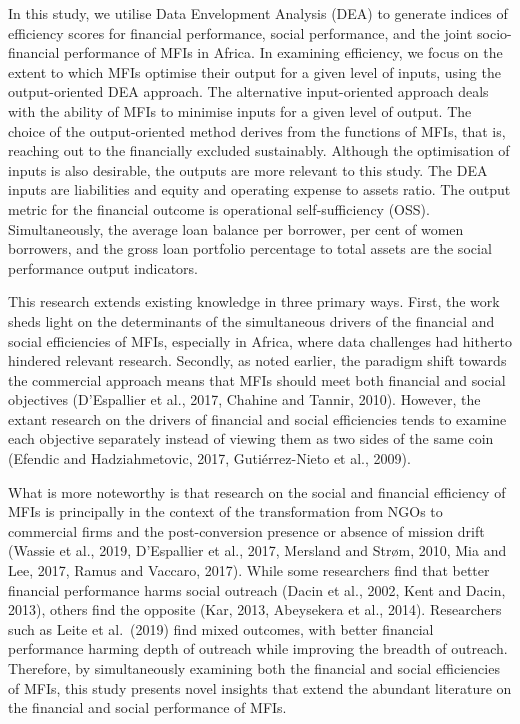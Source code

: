 \documentclass[
]{article}
\begin{document}
In this study, we utilise Data Envelopment Analysis (DEA) to generate
indices of efficiency scores for financial performance, social
performance, and the joint socio-financial performance of MFIs in
Africa. In examining efficiency, we focus on the extent to which MFIs
optimise their output for a given level of inputs, using the
output-oriented DEA approach. The alternative input-oriented approach
deals with the ability of MFIs to minimise inputs for a given level of
output. The choice of the output-oriented method derives from the
functions of MFIs, that is, reaching out to the financially excluded
sustainably. Although the optimisation of inputs is also desirable, the
outputs are more relevant to this study. The DEA inputs are liabilities
and equity and operating expense to assets ratio. The output metric for
the financial outcome is operational self-sufficiency (OSS).
Simultaneously, the average loan balance per borrower, per cent of women
borrowers, and the gross loan portfolio percentage to total assets are
the social performance output indicators.

This research extends existing knowledge in three primary ways. First,
the work sheds light on the determinants of the simultaneous drivers of
the financial and social efficiencies of MFIs, especially in Africa,
where data challenges had hitherto hindered relevant research. Secondly,
as noted earlier, the paradigm shift towards the commercial approach
means that MFIs should meet both financial and social objectives
(D'Espallier et al., 2017, Chahine and Tannir, 2010). However, the
extant research on the drivers of financial and social efficiencies
tends to examine each objective separately instead of viewing them as
two sides of the same coin (Efendic and Hadziahmetovic, 2017,
Gutiérrez-Nieto et al., 2009).

What is more noteworthy is that research on the social and financial
efficiency of MFIs is principally in the context of the transformation
from NGOs to commercial firms and the post-conversion presence or
absence of mission drift (Wassie et al., 2019, D'Espallier et al., 2017,
Mersland and Strøm, 2010, Mia and Lee, 2017, Ramus and Vaccaro, 2017).
While some researchers find that better financial performance harms
social outreach (Dacin et al., 2002, Kent and Dacin, 2013), others find
the opposite (Kar, 2013, Abeysekera et al., 2014). Researchers such as
Leite et al.~(2019) find mixed outcomes, with better financial
performance harming depth of outreach while improving the breadth of
outreach. Therefore, by simultaneously examining both the financial and
social efficiencies of MFIs, this study presents novel insights that
extend the abundant literature on the financial and social performance
of MFIs.
\end{document}
